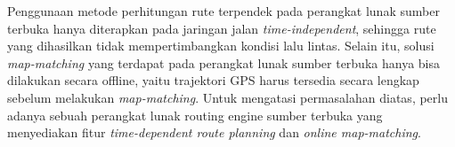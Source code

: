 Penggunaan metode perhitungan rute terpendek pada perangkat lunak sumber terbuka hanya diterapkan pada jaringan jalan \textit{time-independent}, sehingga rute yang dihasilkan tidak mempertimbangkan kondisi lalu lintas. Selain itu, solusi \textit{map-matching} yang terdapat pada perangkat lunak sumber terbuka hanya bisa dilakukan secara offline, yaitu trajektori GPS harus tersedia secara lengkap sebelum melakukan \textit{map-matching}. Untuk mengatasi permasalahan diatas, perlu adanya sebuah perangkat lunak routing engine sumber terbuka yang menyediakan fitur \textit{time-dependent route planning} dan \textit{online map-matching}.